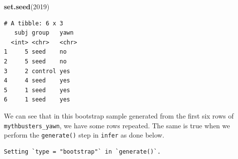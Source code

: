 \documentclass[12pt, krantz2,]{krantz}
\makeatletter
\newenvironment{Shaded}{\begin{snugshade}}{\end{snugshade}}
\newcommand{\DataTypeTok}[1]{\textcolor[rgb]{0.27,0.27,0.27}{#1}}
\newcommand{\DecValTok}[1]{\textcolor[rgb]{0.06,0.06,0.06}{#1}}
\newcommand{\KeywordTok}[1]{\textcolor[rgb]{0.27,0.27,0.27}{\textbf{#1}}}
\newcommand{\NormalTok}[1]{#1}
\newcommand{\OperatorTok}[1]{\textcolor[rgb]{0.43,0.43,0.43}{\textbf{#1}}}
\newcommand{\OtherTok}[1]{\textcolor[rgb]{0.37,0.37,0.37}{#1}}
\newcommand{\StringTok}[1]{\textcolor[rgb]{0.5,0.5,0.5}{#1}}
\newenvironment{kframe}{%
\medskip{}
\setlength{\fboxsep}{.8em}
 \def\at@end@of@kframe{}%
 \ifinner\ifhmode%
  \def\at@end@of@kframe{\end{minipage}}%
  \begin{minipage}{\columnwidth}%
 \fi\fi%
 \def\FrameCommand##1{\hskip\@totalleftmargin \hskip-\fboxsep
 \colorbox{shadecolor}{##1}\hskip-\fboxsep
     \hskip-\linewidth \hskip-\@totalleftmargin \hskip\columnwidth}%
 \MakeFramed {\advance\hsize-\width
   \@totalleftmargin\z@ \linewidth\hsize
   \@setminipage}}%
 {\par\unskip\endMakeFramed%
 \at@end@of@kframe}
\renewenvironment{Shaded}{\begin{kframe}}{\end{kframe}}
\makeatother
\begin{document}
\begin{Shaded}
\begin{Highlighting}[]
\KeywordTok{set.seed}\NormalTok{(}\DecValTok{2019}\NormalTok{)}
\end{Highlighting}
\end{Shaded}

\begin{Shaded}
\end{Shaded}

\begin{verbatim}
# A tibble: 6 x 3
   subj group   yawn 
  <int> <chr>   <chr>
1     5 seed    no   
2     5 seed    no   
3     2 control yes  
4     4 seed    yes  
5     1 seed    yes  
6     1 seed    yes  
\end{verbatim}

We can see that in this bootstrap sample generated from the first six rows of \texttt{mythbusters\_yawn}, we have some rows repeated. The same is true when we perform the \texttt{generate()} step in \texttt{infer} as done below.

\begin{Shaded}
\end{Shaded}

\begin{verbatim}
Setting `type = "bootstrap"` in `generate()`.
\end{verbatim}
\end{document}
